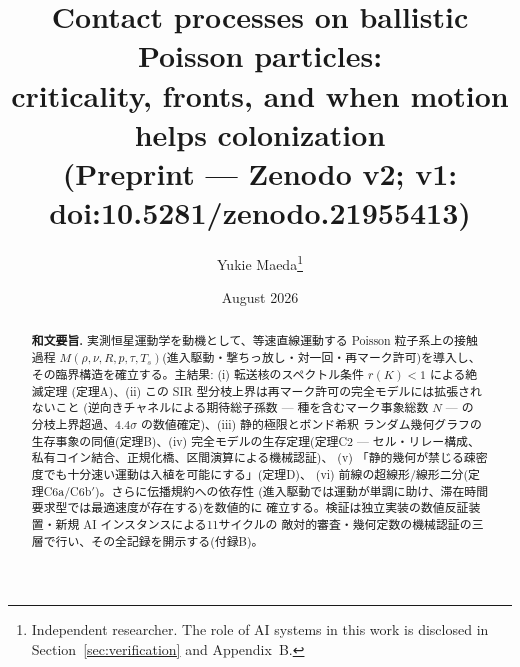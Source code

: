 \documentclass[11pt]{article}
\title{Contact processes on ballistic Poisson particles:\\
criticality, fronts, and when motion helps colonization\\[1ex]
\large (Preprint --- Zenodo v2; v1: doi:10.5281/zenodo.21955413)}
\author{Yukie Maeda\thanks{Independent researcher. The role of AI systems in this
work is disclosed in Section~\ref{sec:verification} and Appendix~B.}}
\date{August 2026}
\newcommand{\Ts}{T_s}
\begin{document}
\maketitle

\begin{abstract}
\noindent\textbf{和文要旨.}
実測恒星運動学を動機として、等速直線運動する Poisson 粒子系上の接触過程
$M(\rho,\nu,R,p,\tau,\Ts)$(進入駆動・撃ちっ放し・対一回・再マーク許可)を導入し、
その臨界構造を確立する。主結果: (i) 転送核のスペクトル条件 $r(K)<1$ による絶滅定理
(定理A)、(ii) この SIR 型分枝上界は再マーク許可の完全モデルには拡張されないこと
(逆向きチャネルによる期待総子孫数 --- 種を含むマーク事象総数 $N$ --- の
分枝上界超過、$4.4\sigma$ の数値確定)、(iii) 静的極限とボンド希釈
ランダム幾何グラフの生存事象の同値(定理B)、(iv) 完全モデルの生存定理(定理C2 ---
セル・リレー構成、私有コイン結合、正規化橋、区間演算による機械認証)、
(v) 「静的幾何が禁じる疎密度でも十分速い運動は入植を可能にする」(定理D)、
(vi) 前線の超線形/線形二分(定理C6a/C6b$'$)。さらに伝播規約への依存性
(進入駆動では運動が単調に助け、滞在時間要求型では最適速度が存在する)を数値的に
確立する。検証は独立実装の数値反証装置・新規 AI インスタンスによる11サイクルの
敵対的審査・幾何定数の機械認証の三層で行い、その全記録を開示する(付録B)。


\end{abstract}
\end{document}
